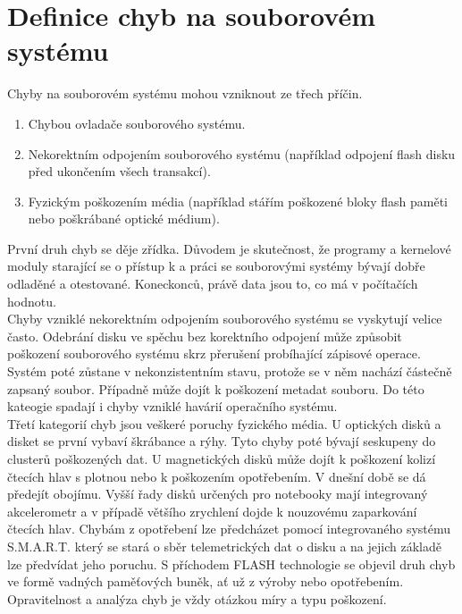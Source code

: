 \chapter{Definice chyb na souborovém systému}
Chyby na souborovém systému mohou vzniknout ze třech příčin. 
\begin{enumerate}
    \item Chybou ovladače souborového systému.
    \item Nekorektním odpojením souborového systému (například odpojení flash disku před ukončením všech transakcí).
    \item Fyzickým poškozením média (například stářím poškozené bloky flash paměti nebo poškrábané optické médium).
\end{enumerate}
První druh chyb se děje zřídka. Důvodem je skutečnost, že programy a kernelové moduly starající se o přístup k a práci se souborovými systémy bývají dobře odladěné a otestované. Koneckonců, právě data jsou to, co má v počítačích hodnotu.\\
Chyby vzniklé nekorektním odpojením souborového systému se vyskytují velice často. Odebrání disku ve spěchu bez korektního odpojení může způsobit poškození souborového systému skrz přerušení probíhající zápisové operace. Systém poté zůstane v nekonzistentním stavu, protože se v něm nachází částečně zapsaný soubor. Případně může dojít k poškození metadat souboru. Do této kateogie spadají i chyby vzniklé havárií operačního systému.\\
Třetí kategorií chyb jsou veškeré poruchy fyzického média. U optických disků a disket se první vybaví škrábance a rýhy. Tyto chyby poté bývají seskupeny do clusterů poškozených dat. U magnetických disků může dojít k poškození kolizí čtecích hlav s plotnou nebo k poškozením opotřebením. V dnešní době se dá předejít obojímu. Vyšší řady disků určených pro notebooky mají integrovaný akcelerometr a v případě většího zrychlení dojde k nouzovému zaparkování čtecích hlav. Chybám z opotřebení lze předcházet pomocí integrovaného systému S.M.A.R.T. který se stará o sběr telemetrických dat o disku a na jejich základě lze předvídat jeho poruchu. S příchodem FLASH technologie se objevil druh chyb ve formě vadných paměťových buněk, ať už z výroby nebo opotřebením.\\
Opravitelnost a analýza chyb je vždy otázkou míry a typu poškození.

